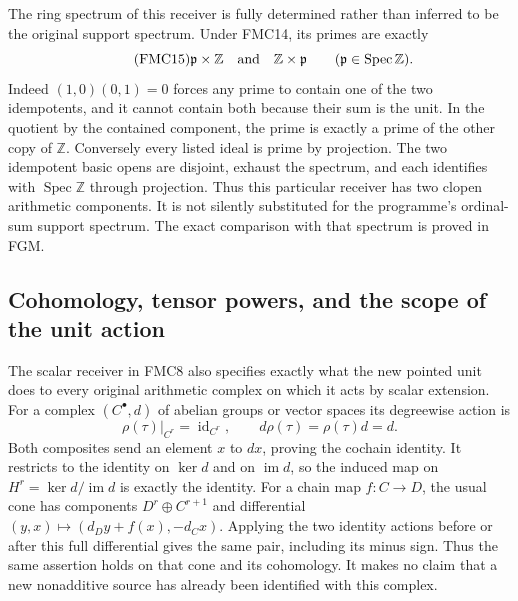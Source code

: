 The ring spectrum of this receiver is fully determined rather than
inferred to be the original support spectrum. Under FMC14, its
primes are exactly
\begin{equation}\tag{FMC15}
\mathfrak p\times\mathbb Z\quad\hbox{and}\quad
\mathbb Z\times\mathfrak p\qquad
(\mathfrak p\in\operatorname{Spec}\mathbb Z).
\end{equation}
Indeed $(1,0)(0,1)=0$ forces any prime to contain one of the two
idempotents, and it cannot contain both because their sum is the
unit. In the quotient by the contained component, the prime is
exactly a prime of the other copy of $\mathbb Z$. Conversely every
listed ideal is prime by projection. The two idempotent basic
opens are disjoint, exhaust the spectrum, and each identifies
with $\operatorname{Spec}\mathbb Z$ through projection. Thus this
particular receiver has two clopen arithmetic components. It is
not silently substituted for the programme's ordinal-sum support
spectrum. The exact comparison with that spectrum is proved in FGM.

\subsection{Cohomology, tensor powers, and the scope of the unit action}
The scalar receiver in FMC8 also specifies exactly what the new
pointed unit does to every original arithmetic complex on which
it acts by scalar extension. For a complex $(C^\bullet,d)$ of
abelian groups or vector spaces its degreewise action is
\begin{equation}\tag{FMC16}
\rho(\tau)|_{C^r}=\operatorname{id}_{C^r},\qquad
d\rho(\tau)=\rho(\tau)d=d.
\end{equation}
Both composites send an element $x$ to $dx$, proving the cochain
identity. It restricts to the identity on $\ker d$ and on
$\operatorname{im}d$, so the induced map on
$H^r=\ker d/\operatorname{im}d$ is exactly the identity.
For a chain map $f:C\to D$, the usual cone has components
$D^r\oplus C^{r+1}$ and differential
$(y,x)\mapsto(d_Dy+f(x),-d_Cx)$. Applying the two identity
actions before or after this full differential gives the same
pair, including its minus sign. Thus the same assertion holds
on that cone and its cohomology. It makes no claim that a new
nonadditive source has already been identified with this complex.

